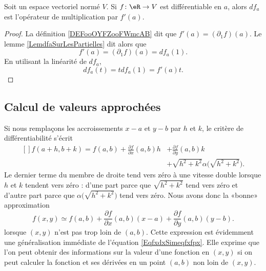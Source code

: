 \begin{lemma}	\label{LEMooXZGQooYxDRRU}
	Soit un espace vectoriel normé \( V\). Si \(f \colon \eR\to V  \) est différentiable en \( a\), alors \( df_a\) est l'opérateur de multiplication par \( f'(a)\).
\end{lemma}

\begin{proof}
	La définition \ref{DEFooOYFZooFWmcAB} dit que \( f'(a)=(\partial_1f)(a)\). Le lemme \ref{LemdfaSurLesPartielles} dit alors que
	\begin{equation}
		f'(a)=(\partial_1f)(a)=df_a(1).
	\end{equation}
	En utilisant la linéarité de \( df_a\),
	\begin{equation}
		df_a(t)=tdf_a(1)=f'(a)t.
	\end{equation}
\end{proof}

\subsection{Calcul de valeurs approchées}

Si nous remplaçons les accroissements \( x-a\) et \( y-b\) par \( h\) et \( k\), le critère de différentiabilité s'écrit
\begin{equation}
	\begin{aligned}[]
		f(a+h,b+k)=f(a,b)+\frac{ \partial f }{ \partial x }(a,b)h & +\frac{ \partial f }{ \partial y }(a,b)k         \\
		                                                          & +\sqrt{h^2+k^2}\alpha\big( \sqrt{h^2+k^2} \big).
	\end{aligned}
\end{equation}
Le dernier terme du membre de droite tend vers zéro à une vitesse double lorsque \( h\) et \( k\) tendent vers zéro : d'une part parce que \( \sqrt{h^2+k^2}\) tend vers zéro et d'autre part parce que \( \alpha\big( \sqrt{h^2+k^2} \big)\) tend vers zéro. Nous avons donc la «bonne» approximation
\begin{equation}        \label{EqFormApproxfxyab}
	f(x,y)\simeq f(a,b)+\frac{ \partial f }{ \partial x }(a,b)(x-a)+\frac{ \partial f }{ \partial y }(a,b)(y-b).
\end{equation}
lorsque \( (x,y)\) n'est pas trop loin de \( (a,b)\). Cette expression est évidemment une généralisation immédiate de l'équation \eqref{EqfxdxSimeqfxfpx}. Elle exprime que l'on peut obtenir des informations sur la valeur d'une fonction en \( (x,y)\) si on peut calculer la fonction et ses dérivées en un point \( (a,b)\) non loin de \( (x,y)\).

